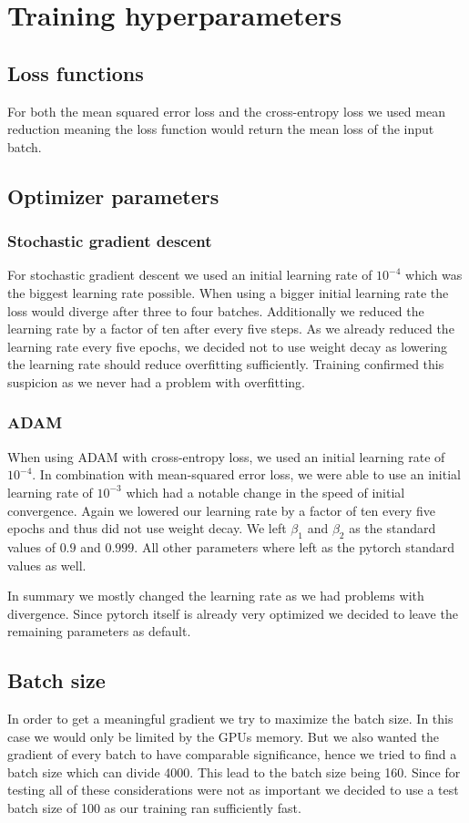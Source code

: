 \vspace{3 em}
\section{Training hyperparameters}

\subsection{Loss functions}

For both the mean squared error loss and the cross-entropy loss we used mean reduction meaning the loss function would return the mean loss of the input batch.

\subsection{Optimizer parameters}

\subsubsection{Stochastic gradient descent}
For stochastic gradient descent we used an initial learning rate of $10^{-4}$ which was the biggest learning rate possible.
When using a bigger initial learning rate the loss would diverge after three to four batches. Additionally we reduced the learning rate by a factor of ten after every five steps.
As we already reduced the learning rate every five epochs, we decided not to use weight decay as lowering the learning rate should reduce overfitting sufficiently.
Training confirmed this suspicion as we never had a problem with overfitting.

\subsubsection{ADAM}
When using ADAM with cross-entropy loss, we used an initial learning rate of $10^{-4}$. In combination with mean-squared error loss, we were able to use an initial learning rate of $10^{-3}$ which had a notable change in the speed of initial convergence.
Again we lowered our learning rate by a factor of ten every five epochs and thus did not use weight decay. We left $\beta_1$ and $\beta_2$ as the standard values of $0.9$ and $0.999$. All other parameters where left as the pytorch standard values as well.

In summary we mostly changed the learning rate as we had problems with divergence. Since pytorch itself is already very optimized we decided to leave the remaining parameters as default.

\subsection{Batch size}
In order to get a meaningful gradient we try to maximize the batch size.
In this case we would only be limited by the GPUs memory.
But we also wanted the gradient of every batch to have comparable significance, hence we tried to find a batch size which can divide 4000.
This lead to the batch size being 160. Since for testing all of these considerations were not as important we decided to use a test batch size of 100 as our training ran sufficiently fast.
